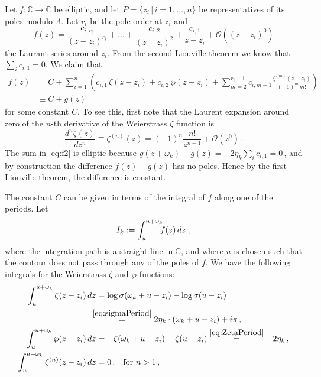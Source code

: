 \documentclass[11pt,a4paper]{article}
\numberwithin{equation}{section}
\begin{document}
Let $f : \mathbb{C} \to \overline{\mathbb{C}}$ be elliptic, and let $P = \{ z_i \,|\, i = 1,\dots,n\}$ be representatives of its poles modulo $\Lambda$. Let $r_i$ be the pole order at $z_i$ and 
\begin{equation}\label{eq:f1}
f(z) = \frac{c_{i,r_i}}{(z-z_i)^{r_i}} + \dots + \frac{c_{i,2}}{(z-z_i)^{2}} + \frac{c_{i,1}}{z-z_i} + \mathcal{O}\!\left(\left(z-z_i\right)^0\right)
\end{equation}
the Laurant series around $z_i$. From the second Liouville theorem we know that $\sum_i c_{i,1} =0$. We claim that
%
\begin{align}
f(z) &= C + \sum_{i=1}^n \left(c_{i,1} \,\zeta(z-z_i) + c_{i,2} \,\wp(z-z_i) + \sum_{m=2}^{r_i-1} c_{i,m+1} \frac{\zeta^{(m)}(z-z_i)}{(-1)^{m}\,m!} \right)
\nonumber\\
&\equiv C+g(z)
\label{eq:f2}
\end{align}
%
for some constant $C$. To see this, first note that the Laurent expansion around zero of the $n$-th derivative of the Weierstrass $\zeta$ function is
\begin{equation}
\frac{d^n\zeta(z)}{dz^n} \equiv \zeta^{(n)}(z) = (-1)^n \frac{n!}{z^{n+1}} + \mathcal{O}(z^0)\,.
\end{equation}
The sum in \eqref{eq:f2} is  elliptic because 
    $g(z+\omega_k) - g(z) = - 2 \eta_k  \sum_i c_{i,1} =0$\,, 
and by construction the difference $f(z) - g(z)$ has no poles.
Hence by the first Liouville theorem, the difference is constant.

The constant $C$ can be given in terms of the integral of $f$ along one of the periods.
Let
\begin{equation}
    I_k := \int_u^{u+\omega_k} \hspace{-.5em} f(z)\, dz ~,
\end{equation}
where the integration path is a straight line in $\mathbb{C}$, and where $u$ is chosen such that the contour does not pass through any of the poles of $f$. We have the following integrals for the Weierstrass $\zeta$ and $\wp$ functions:
\begin{align}
    \int_u^{u+\omega_k} \zeta(z-z_i) \, dz &= \log\sigma(\omega_k+u-z_i) - \log\sigma(u-z_i) \nonumber\\
    &\hspace{-.25cm}\stackrel{\eqref{eq:sigmaPeriod}}{=} 
    2 \eta_k  \cdot
    (\omega_k+u-z_i) +i\pi \,,\label{eq:intZeta}\\
    \int_u^{u+\omega_k} \wp(z-z_i)\,dz &= -\zeta(\omega_k+u -z_i) + \zeta(u-z_i) \stackrel{\eqref{eq:ZetaPeriod}}{=}
    - 2 \eta_k \,,
    \label{eq:intWP}\\
    \int_u^{u+\omega_k} \zeta^{(n)}(z-z_i)\,dz &= 0\,. \quad \text{for} ~n>1\,,\label{eq:intHigherDer}
\end{align}
\end{document}
